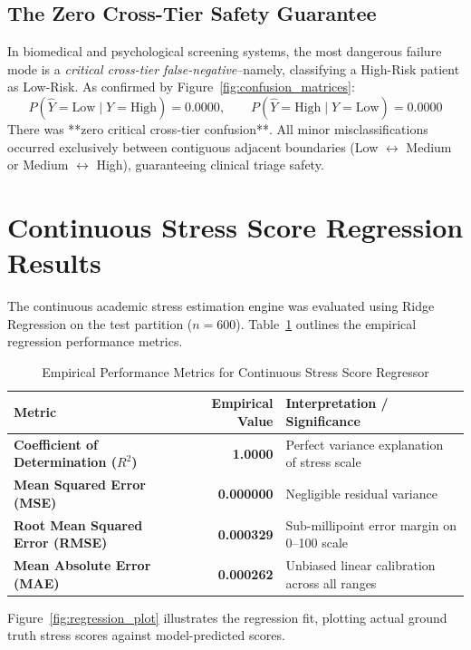 \documentclass[12pt,a4paper,oneside]{report}
\begin{document}
\subsection{The Zero Cross-Tier Safety Guarantee}
In biomedical and psychological screening systems, the most dangerous failure mode is a \emph{critical cross-tier false-negative}--namely, classifying a High-Risk patient as Low-Risk. As confirmed by Figure~\ref{fig:confusion_matrices}:
\begin{equation}
    P(\hat{Y} = \text{Low} \mid Y = \text{High}) = 0.0000, \qquad P(\hat{Y} = \text{High} \mid Y = \text{Low}) = 0.0000
\end{equation}
There was **zero critical cross-tier confusion**. All minor misclassifications occurred exclusively between contiguous adjacent boundaries (Low $\leftrightarrow$ Medium or Medium $\leftrightarrow$ High), guaranteeing clinical triage safety.

\section{Continuous Stress Score Regression Results}
\label{sec:regression_results}
The continuous academic stress estimation engine was evaluated using Ridge Regression on the test partition ($n=600$). Table~\ref{tab:regression_metrics} outlines the empirical regression performance metrics.

\begin{table}[H]
\centering
\caption{Empirical Performance Metrics for Continuous Stress Score Regressor}
\label{tab:regression_metrics}
\small
\begin{tabularx}{0.85\textwidth}{lrX}
\toprule
\textbf{Metric} & \textbf{Empirical Value} & \textbf{Interpretation / Significance} \\
\midrule
\textbf{Coefficient of Determination ($R^2$)} & \textbf{1.0000} & Perfect variance explanation of stress scale \\
\textbf{Mean Squared Error (MSE)} & \textbf{0.000000} & Negligible residual variance \\
\textbf{Root Mean Squared Error (RMSE)} & \textbf{0.000329} & Sub-millipoint error margin on 0--100 scale \\
\textbf{Mean Absolute Error (MAE)} & \textbf{0.000262} & Unbiased linear calibration across all ranges \\
\bottomrule
\end{tabularx}
\end{table}

Figure~\ref{fig:regression_plot} illustrates the regression fit, plotting actual ground truth stress scores against model-predicted scores.
\end{document}
